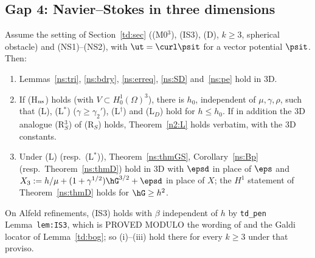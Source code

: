 \subsection{Gap 4: Navier--Stokes in three dimensions}\label{n2:3d}

\begin{corollary}\label{n2:td}
Assume the setting of Section~\ref{td:sec} ((M0$^3$), (IS3), (D), $k\ge3$, spherical obstacle) and (NS1)--(NS2), with $\ut=\curl\psit$ for a vector
potential $\psit$. Then:
\begin{enumerate}[label=(\roman*)]
\item Lemmas~\ref{ns:tri}, \ref{ns:bdry}, \ref{ns:erreq}, \ref{ns:SD} and~\ref{ns:pe} hold in 3D.
\item If (H$_{\rm ns}$) holds (with $V\subset H^1_0(\Omega)^3$), there is $h_0$, independent of $\mu,\gamma,\rho$, such that (L), (L$^\ast$) ($\gamma\ge\gamma_2'$),
(L$^\dagger$) and (L$_D$) hold for $h\le h_0$. If in addition the 3D analogue (R$_S^3$) of (R$_S$) holds, Theorem~\ref{n2:L} holds verbatim, with
the 3D constants.
\item Under (L) (resp.\ (L$^\ast$)), Theorem~\ref{ns:thmGS}, Corollary~\ref{ns:Bp} (resp.\ Theorem~\ref{ns:thmD}) hold in 3D with $\epsd$ in place of
$\eps$ and $X_3:=h/\mu+(1+\gamma^{1/2})\hG^{3/2}+\epsd$ in place of $X$; the $H^1$ statement of Theorem~\ref{ns:thmD} holds for $\hG\ge h^2$.
\end{enumerate}
On Alfeld refinements, (IS3) holds with $\beta$ independent of $h$ by \texttt{td\_pen} Lemma~\texttt{lem:IS3}, which is PROVED MODULO the wording of
\cite[Thm~3.1]{GuzmanNeilan2018} and the Galdi locator of Lemma~\ref{td:bog}; so (i)--(iii) hold there for every $k\ge3$ under that proviso.
\end{corollary}


